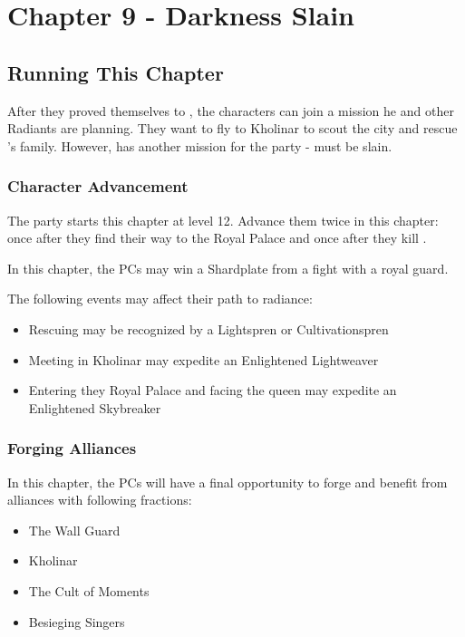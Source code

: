 \chapter{Chapter 9 - Darkness Slain}
\label{chap:chapter9}

\setcounter{section}{-1}
\section{Running This Chapter}

After they proved themselves to \npcDalinar{}, the characters can join a mission he and other Radiants are planning. They want to fly to Kholinar to scout the city and rescue \npcElhokar{}'s family. However, \npcSjaAnat{} has another mission for the party - \npcQueen{} must be slain.

\subsection{Character Advancement}

The party starts this chapter at level 12. Advance them twice in this chapter: once after they find their way to the Royal Palace and once after they kill \npcQueen{}.

In this chapter, the PCs may win a Shardplate from a fight with a royal guard.

The following events may affect their path to radiance:
\begin{itemize}
	\item Rescuing \npcGavinor{} may be recognized by a Lightspren or Cultivationspren
	\item Meeting \npcSjaAnat{} in Kholinar may expedite an Enlightened Lightweaver
	\item Entering they Royal Palace and facing the queen may expedite an Enlightened Skybreaker
\end{itemize}



\subsection{Forging Alliances}

In this chapter, the PCs will have a final opportunity to forge and benefit from alliances with following fractions:
\begin{itemize}
	\item The Wall Guard
	\item Kholinar \npcFractionGhostbloods{}
	\item The Cult of Moments
	\item Besieging Singers
\end{itemize}

